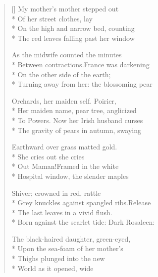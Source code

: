 \label{ch:halifax}
\settowidth{\versewidth}{Between contractions.\quad France was darkening}
\begin{verse}[\versewidth]
My mother's mother stepped out\\*
Of her street clothes, lay\\*
On the high and narrow bed, counting\\*
The red leaves falling past her window

As the midwife counted the minutes\\*
Between contractions.\quad France was darkening\\*
On the other side of the earth;\\*
Turning away from her: the blossoming pear

Orchards, her maiden self. Poirier,\\*
Her maiden name, pear tree, anglicized\\*
To Powers. Now her Irish husband curses\\*
The gravity of pears in autumn, swaying

Earthward over grass matted gold.\\*
She cries out she cries\\*
Out Maman!\quad  Framed in the white\\*
Hospital window, the slender maples

Shiver; crowned in red, rattle\\*
Grey knuckles against spangled ribs.\quad Release\\*
The last leaves in a vivid flush.\\*
Born against the scarlet tide: Dark Rosaleen:

The black-haired daughter, green-eyed,\\*
Upon the sea-foam of her mother's\\*
Thighs plunged into the new\\*
World as it opened, wide
\end{verse}

